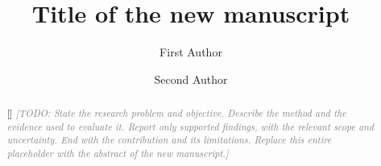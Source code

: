 \documentclass[a4paper,fleqn]{cas-sc}
\newcommand{\placeholder}[1]{\textcolor{gray}{\textit{[TODO: #1]}}}
\newcommand{\figureplaceholder}[2]{%
  \begingroup
  \setlength{\fboxsep}{10pt}%
  \fbox{\parbox[c][#1][c]{\dimexpr\linewidth-2\fboxsep-2\fboxrule\relax}{%
    \centering\sffamily\color{gray}#2}}%
  \endgroup
}
\newif\ifshowgraphicalabstract
\newif\ifshowhighlights
\begin{document}
\let\WriteBookmarks\relax
\def\floatpagepagefraction{1}
\def\textpagefraction{.001}

\title[mode = title]{Title of the new manuscript} %

\author[1]{First Author} %


\author[1]{Second Author} %
\cormark[1] %

\begin{abstract}[]
\placeholder{State the research problem and objective. Describe the method and
the evidence used to evaluate it. Report only supported findings, with the
relevant scope and uncertainty. End with the contribution and its limitations.
Replace this entire placeholder with the abstract of the new manuscript.}
\end{abstract}

\ifshowgraphicalabstract
\begin{graphicalabstract}
\centering
\figureplaceholder{48mm}{Graphical abstract\\[4pt]TODO: replace with your own figure}
\end{graphicalabstract}
\fi

\ifshowhighlights
\begin{highlights}
  \item \placeholder{Main contribution, within the journal's length limit.}
  \item \placeholder{Distinctive feature of the method.}
  \item \placeholder{Finding supported by the new study's evidence.}
\end{highlights}
\fi
\end{document}
